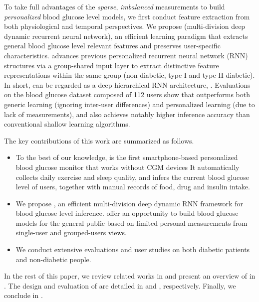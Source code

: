To take full advantages of the \textit{sparse}, \textit{imbalanced} measurements to build \textit{personalized} blood glucose level models, we first conduct feature extraction from both physiological and temporal perspectives.
We propose \modelname (multi-division deep dynamic recurrent neural network), an efficient learning paradigm that extracts general blood glucose level relevant features and preserves user-specific characteristics.
\modelname advances previous personalized recurrent neural network (RNN) structures via a group-shared input layer to extract distinctive feature representations within the same group (\ie non-diabetic, type I and type II diabetic).
In short, \modelname can be regarded as a deep hierarchical RNN architecture, .
Evaluations on the blood glucose dataset composed of 112 users  show that \modelname outperforms both generic learning (\ie ignoring inter-user differences) and personalized learning (due to lack of measurements), and also achieves notably higher inference accuracy than conventional shallow learning algorithms.

The key contributions of this work are summarized as follows.
\begin{itemize}
  \item
  To the best of our knowledge, \sysname is the first smartphone-based personalized blood glucose monitor that works without CGM devices 
  It automatically collects daily exercise and sleep quality, and infers the current blood glucose level of users, together with manual records of food, drug and insulin intake.
  \item
  We propose \modelname, an efficient multi-division deep dynamic RNN framework for blood glucose level inference.
   offer an opportunity to build blood glucose models for the general public based on limited personal measurements from single-user and grouped-users views.
  \item
  We conduct extensive evaluations and user studies on both diabetic patients and non-diabetic people.
\end{itemize}

In the rest of this paper, we review related works in  and present an overview of \sysname in .
The design and evaluation of \sysname are detailed in  and , respectively.
Finally, we conclude in .

